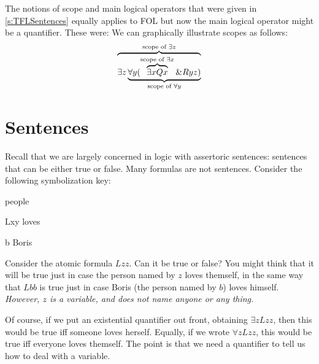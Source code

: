  The notions of scope and main logical operators that were given in \ref{s:TFLSentences} equally applies to FOL but now the main logical operator might be a quantifier. These were:
We can graphically illustrate scopes as follows:
$$
\overbrace{
\exists z
\underbrace{\forall y (\overbrace{\exists x Qx}^{\text{scope of $\exists x$}}\mathbin{\&} Ryz)}_{\text{scope of $\forall y$}}
}^{\text{scope of $\exists z$}}
$$





\section{Sentences}
Recall that we are largely concerned in logic with assertoric sentences: sentences that can be either true or false. Many formulas are not sentences. Consider the following symbolization key:
	\begin{ekey}
		\item[\text{domain}] people
		\item[Lxy]  loves 
		\item[b] Boris
	\end{ekey}
Consider the atomic formula $Lzz$. Can it be true or false? You might think that it will be true just in case the person named by $z$ loves themself, in the same way that $Lbb$ is true just in case Boris (the person named by $b$) loves himself. \emph{However, $z$ is a variable, and does not name anyone or any thing.}

Of course, if we put an existential quantifier out front, obtaining $\exists zLzz$, then this would be true iff someone loves herself. Equally, if we wrote $\forall z Lzz$, this would be true iff everyone loves themself. The point is that we need a quantifier to tell us how to deal with a variable.

